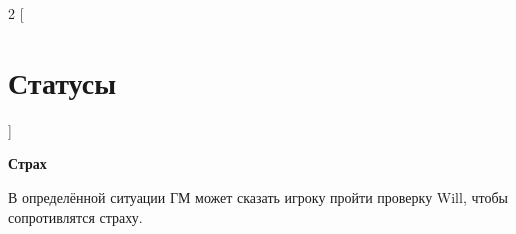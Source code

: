 \begin{multicols}{2}
    [
    \section{Статусы}
    ]    

    \textbf{Страх}

    В определённой ситуации ГМ может сказать игроку пройти проверку Will, чтобы сопротивлятся страху.
\end{multicols}